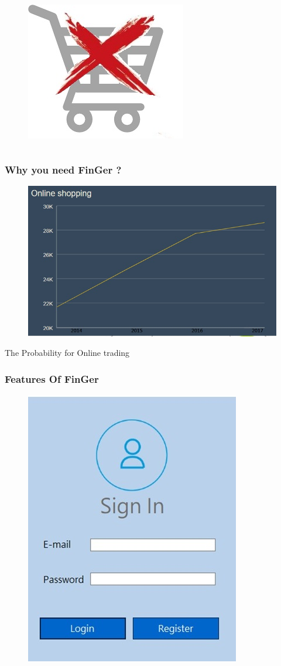 \documentclass{beamer}
\begin{document}
\begin{CJK}{UTF8}{bsmi}
\begin{frame}
\begin{columns}[c]

\begin{figure}
\includegraphics[width=0.4\linewidth]{car.jpg}
\end{figure}

\end{columns}


\end{frame}


\begin{frame}
\frametitle{Why you need FinGer ?}

\begin{figure}
\includegraphics[width=0.8\linewidth]{online.jpg}
\end{figure}
\begin{center}
The Probability for Online trading
\end{center}

\end{frame}


\begin{frame}
\frametitle{Features Of FinGer}

\begin{figure}
\includegraphics[width=0.4\linewidth]{signin.jpg}
\end{figure}


\end{frame}
\end{CJK}
\end{document}
